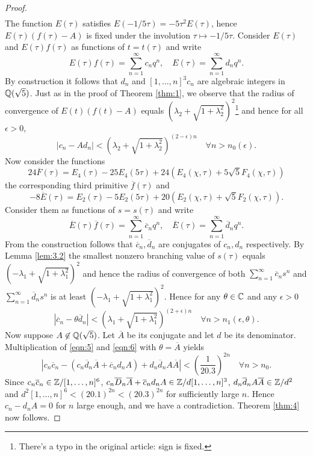 \begin{proof}
\begin{align*}
\end{align*}
The function $E(\tau)$ satisfies $E(-1/5\tau) = -5\tau^2 E(\tau)$, hence $E(\tau) (f(\tau) - A)$ is fixed under the involution $\tau \mapsto -1/5\tau$.
Consider $E(\tau)$ and $E(\tau)f(\tau)$ as functions of $t = t(\tau)$ and write
$$
    E(\tau)f(\tau) = \sum_{n=1}^{\infty} c_n q^n, \quad E(\tau) = \sum_{n=1}^{\infty} d_n q^n.
$$
By construction it follows that $d_n$ and $[1, \dots, n]^3 c_n$ are algebraic integers in $\mathbb{Q}(\sqrt{5})$.
Just as in the proof of Theorem \ref{thm:1}, we observe that the radius of convergence of $E(t)(f(t) - A)$ equals $(\lambda_2 + \sqrt{1 + \lambda_2^2})^2$\footnote{There's a typo in the original article: sign is fixed.} and hence for all $\epsilon > 0$,
\begin{equation}
    \label{eqn:5}
    |c_n - A d_n| < (\lambda_2 + \sqrt{1 + \lambda_2^2})^{(2 - \epsilon)n} \quad \forall n > n_0(\epsilon).
\end{equation}
Now consider the functions
$$
    24 \overline{F}(\tau) = E_4(\tau) - 25 E_4(5\tau) + 24(E_4(\chi, \tau) + 5\sqrt{5} F_4(\chi, \tau)) 
$$
the corresponding third primitive $\overline{f}(\tau)$ and
$$
    -8 \overline{E}(\tau) = E_2(\tau) - 5 E_2(5\tau) + 20 (E_2(\chi, \tau) + \sqrt{5} F_2(\chi, \tau)).
$$
Consider them as functions of $s = s(\tau)$ and write
$$
    \overline{E}(\tau) \overline{f}(\tau) = \sum_{n=1}^{\infty} \overline{c}_n q^n, \quad \overline{E}(\tau) = \sum_{n=1}^{\infty} \overline{d}_n q^n.
$$
From the construction follows that $\overline{c}_n, \overline{d}_n$ are conjugates of $c_n, d_n$ respectively.
By Lemma \ref{lem:3.2} the smallest nonzero branching value of $s(\tau)$ equals $(-\lambda_1 + \sqrt{1 + \lambda_1^2})^{2}$ and hence the radius of convergence of both $\sum_{n=1}^{\infty} \overline{c}_{n} s^n$ and $\sum_{n=1}^{\infty} \overline{d}_{n} s^n$ is at least $(-\lambda_1 + \sqrt{1 + \lambda_1^2})^{2}$.
Hence for any $\theta \in \mathbb{C}$ and any $\epsilon > 0$
\begin{equation}
    \label{eqn:6}
    |\overline{c}_n - \theta \overline{d}_n| < (\lambda_1 + \sqrt{1 + \lambda_1^2})^{(2 + \epsilon) n} \quad \forall n > n_1(\epsilon, \theta).
\end{equation}
Now suppose $A \not\in \mathbb{Q}(\sqrt{5})$.
Let $\overline{A}$ be its conjugate and let $d$ be its denominator.
Multiplication of \eqref{eqn:5} and \eqref{eqn:6} with $\theta = \overline{A}$ yields
\begin{equation}
    \label{eqn:7}
    |c_n \overline{c}_n - (c_n \overline{d}_n \overline{A} + \overline{c}_n d_n A) + d_n \overline{d}_n A\overline{A}| < \left(\frac{1}{20.3}\right)^{2n} \quad \forall n > n_0.
\end{equation}
Since $c_n \overline{c}_n \in \mathbb{Z} / [1, \dots, n]^{6}$, $c_n \overline{D}_n \overline{A} + \overline{c}_n d_n A \in \mathbb{Z} / d[1, \dots, n]^{3}$, $d_n \overline{d}_n A \overline{A} \in \mathbb{Z} / d^2$ and $d^2 [1, \dots, n]^6 < (20.1)^{2n} < (20.3)^{2n}$ for sufficiently large $n$.
Hence $c_n - d_n A = 0$ for $n$ large enough, and we have a contradiction.
Theorem \ref{thm:4} now follows.
\end{proof}

